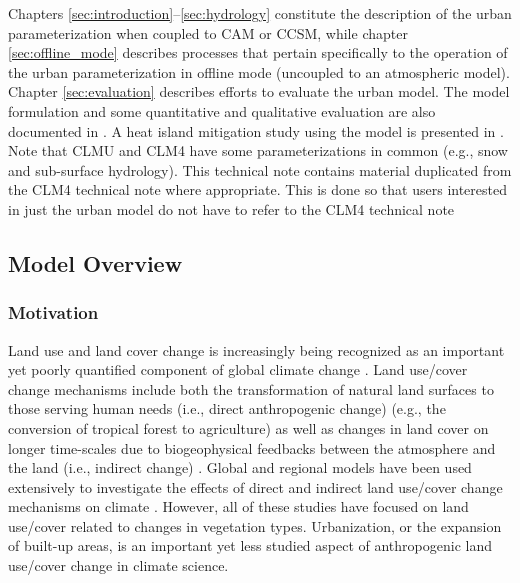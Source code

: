 \documentclass[12pt,authoryear]{elsarticle}
\numberwithin{equation}{section} %
\begin{document}
Chapters \ref{sec:introduction}--\ref{sec:hydrology} constitute the description of the urban parameterization when coupled to CAM or CCSM, while chapter \ref{sec:offline_mode} describes processes that pertain specifically to the operation of the urban parameterization in offline mode (uncoupled to an atmospheric model). Chapter \ref{sec:evaluation} describes efforts to evaluate the urban model. The model formulation and some quantitative and qualitative evaluation are also documented in \citet{OLESONETAL08J.Appl.Meteorol.Climatol.a,OLESONETAL08J.Appl.Meteorol.Climatol.b}. A heat island mitigation study using the model is presented in \citet{OLESONETAL10Geophys.Res.Lett.}. Note that CLMU and CLM4 have some parameterizations in common (e.g., snow and sub-surface hydrology). This technical note contains material duplicated from the CLM4 technical note \citep{OLESONETAL10} where appropriate. This is done so that users interested in just the urban model do not have to refer to the CLM4 technical note

\subsection{Model Overview}
\subsubsection{Motivation}
Land use and land cover change is increasingly being recognized as an important yet poorly quantified component of global climate change \citep{houghtonClimateChange20012002}. Land use/cover change mechanisms include both the transformation of natural land surfaces to those serving human needs (i.e., direct anthropogenic change) (e.g., the conversion of
tropical forest to agriculture) as well as changes in land cover on longer time-scales due to biogeophysical feedbacks between the atmosphere and the land (i.e., indirect change) \citep{cramerGlobalResponseTerrestrial2001,foleyGlobalConsequencesLand2005}. Global and regional models have been used
extensively to investigate the effects of direct and indirect land use/cover change mechanisms on climate \citep{copelandPotentialClimaticImpacts1996,stohlgrenEvidenceThatLocal1998,bettsBiogeophysicalImpactsLand2001,eastmanRegionalEffectsCO22001,bounouaEffectsLandCover2002,pielkesr.InfluenceLanduseChange2002,fuPotentialImpactsHumaninduced2003,myhreUncertaintiesRadiativeForcing2003,narismaImpact200Years2003,wangImpactLandcoverModification2003,brovkinRoleLandCover2004,matthewsNaturalAnthropogenicClimate2004,feddemaImportanceLandCoverChange2005}. However, all of these studies have focused on land use/cover related to changes in vegetation types. Urbanization, or the expansion of built-up areas, is an important yet less studied aspect of anthropogenic land use/cover change in climate science.
\end{document}

